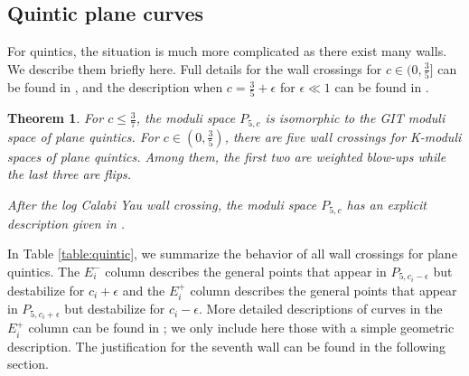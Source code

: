\documentclass[11pt]{amsart}
\numberwithin{equation}{section}
\newtheorem{theorem}{Theorem}[section]
\theoremstyle{definition}
\begin{document}
\subsection{Quintic plane curves}

For quintics, the situation is much more complicated as there exist many walls.  We describe them briefly here.  Full details for the wall crossings for $c \in (0, \frac{3}{5}]$ can be found in \cite{ADLpub, BABWILD}, and the description when $c = \frac{3}{5} + \epsilon$ for $\epsilon \ll 1$ can be found in \cite{hacking}.

\begin{theorem}
For $c \le \frac{3}{7}$, the moduli space $P_{5,c}$ is isomorphic to the GIT moduli space of plane quintics.  For $c \in (0, \frac{3}{5})$, there are five wall crossings for K-moduli spaces of plane quintics. Among them, the first two are weighted blow-ups while the last three are flips. 

After the log Calabi Yau wall crossing, the moduli space $P_{5,c}$ has an explicit description given in \cite[Section 11]{hacking}.
 \end{theorem} 


  
   In Table \ref{table:quintic}, we summarize the behavior of all wall crossings for plane quintics.  The $E_i^-$ column describes the general points that appear in $P_{5, c_i - \epsilon}$ but destabilize for $c_i + \epsilon$ and the $E_i^+$ column describes the general points that appear in $P_{5, c_i + \epsilon}$ but destabilize for $c_i - \epsilon$.  More detailed descriptions of curves in the $E_i^+$ column can be found in \cite{ADLpub}; we only include here those with a simple geometric description.  The justification for the seventh wall can be found in the following section.
\end{document}
